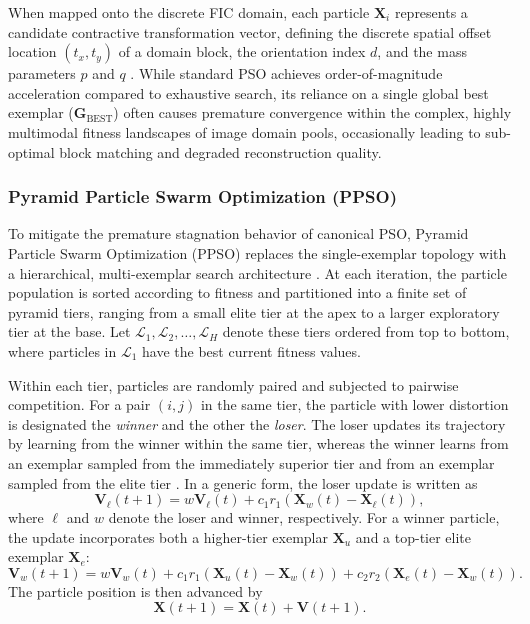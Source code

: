 \documentclass[conference]{IEEEtran}
\begin{document}
When mapped onto the discrete FIC domain, each particle $\mathbf{X}_i$ represents a candidate contractive transformation vector, defining the discrete spatial offset location $(t_x, t_y)$ of a domain block, the orientation index $d$, and the mass parameters $p$ and $q$ \cite{FICOriginal, PSOFIC}. While standard PSO achieves order-of-magnitude acceleration compared to exhaustive search, its reliance on a single global best exemplar ($\mathbf{G}_{\text{BEST}}$) often causes premature convergence within the complex, highly multimodal fitness landscapes of image domain pools, occasionally leading to sub-optimal block matching and degraded reconstruction quality.

\subsubsection{Pyramid Particle Swarm Optimization (PPSO)}
To mitigate the premature stagnation behavior of canonical PSO, Pyramid Particle Swarm Optimization (PPSO) replaces the single-exemplar topology with a hierarchical, multi-exemplar search architecture \cite{li2022pyramid}. At each iteration, the particle population is sorted according to fitness and partitioned into a finite set of pyramid tiers, ranging from a small elite tier at the apex to a larger exploratory tier at the base. Let $\mathcal{L}_1, \mathcal{L}_2, \dots, \mathcal{L}_H$ denote these tiers ordered from top to bottom, where particles in $\mathcal{L}_1$ have the best current fitness values.

Within each tier, particles are randomly paired and subjected to pairwise competition. For a pair $(i,j)$ in the same tier, the particle with lower distortion is designated the \emph{winner} and the other the \emph{loser}. The loser updates its trajectory by learning from the winner within the same tier, whereas the winner learns from an exemplar sampled from the immediately superior tier and from an exemplar sampled from the elite tier \cite{li2022pyramid}. In a generic form, the loser update is written as
\begin{equation}
\mathbf{V}_{\ell}(t+1)=w\mathbf{V}_{\ell}(t)+c_1r_1\left(\mathbf{X}_{w}(t)-\mathbf{X}_{\ell}(t)\right),
\end{equation}
where $\ell$ and $w$ denote the loser and winner, respectively. For a winner particle, the update incorporates both a higher-tier exemplar $\mathbf{X}_{u}$ and a top-tier elite exemplar $\mathbf{X}_{e}$:
\begin{equation}
\mathbf{V}_{w}(t+1)=w\mathbf{V}_{w}(t)+c_1r_1\left(\mathbf{X}_{u}(t)-\mathbf{X}_{w}(t)\right)+c_2r_2\left(\mathbf{X}_{e}(t)-\mathbf{X}_{w}(t)\right).
\end{equation}
The particle position is then advanced by
\begin{equation}
\mathbf{X}(t+1)=\mathbf{X}(t)+\mathbf{V}(t+1).
\end{equation}
\end{document}
